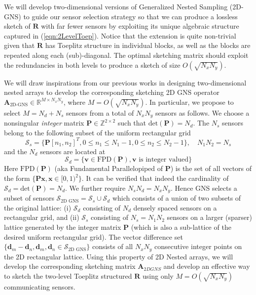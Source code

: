 {\noindent We will develop two-dimensional versions of Generalized Nested Sampling (2D-GNS) to guide our sensor selection strategy so that we can produce a lossless sketch of $\mathbf{R}$ with far fewer sensors by exploiting its unique algebraic structure captured in (\ref{eqn:2LevelToep}). Notice that the extension is quite non-trivial given that $\mathbf{R}$ has Toeplitz structure in individual blocks, as well as the blocks are repeated along each (sub)-diagonal. The optimal sketching matrix should exploit the redundancies in both levels to produce a sketch of size $O(\sqrt{N_xN_y})$. 

 We will draw inspirations from our previous works in designing two-dimensional nested arrays to develop the corresponding sketching 2D GNS operator $\mathbf{A}_{\text{2D-GNS}} \in \mathbb{R}^{M \times {N_xN_y}}$, where $M = O(\sqrt{N_xN_y})$. In particular, we propose to select $M=N_d+N_s$ sensors from a total of $N_xN_y$ sensors as follows. We choose a nonsingular {\em integer} matrix $\mathbf{P}\in \mathbb{Z}^{2\times 2}$ such that $\text{det}(\mathbf{P})=N_d$. The $N_s$ sensors belong to the following subset  of the uniform rectangular grid \[ \mathcal{S}_{s} = \{\mathbf{P}[n_1,n_2]^{T}, 0\leq n_1\leq N_1-1, 0\leq n_2\leq N_2-1 \} ,\quad N_1N_2 = N_s \]
and the $N_d$ sensors are located at \[ \mathcal{S}_d = \{ \mathbf{v} \in \text{FPD}(\mathbf{P}), \mathbf{v} \text{ is integer valued} \} \] 
Here $\text{FPD}(\mathbf{P})$ (aka Fundamental Parallelopiped of $\mathbf{P}$)  is the set of all vectors of the form $\{\mathbf{Px}, \mathbf{x}\in[0,1)^2 \}$. It can be verified that indeed the cardinality of $\mathcal{S}_d = \text{det}(\mathbf{P}) = N_d$. We further require $N_sN_d = N_xN_y$. Hence GNS selects a subset of sensors $\mathcal{S}_{\text{2D GNS}} = \mathcal{S}_s\cup \mathcal{S}_d$ which consists of a union of two subsets of the original lattice: (i) $\mathcal{S}_d$ consisting of $N_d$ densely spaced sensors on a rectangular grid, and (ii) $\mathcal{S}_s$ consisting of $N_s = N_1N_2$ sensors on a larger (sparser) lattice generated by the integer matrix $\mathbf{P}$ (which is also a sub-lattice of the desired uniform rectangular grid). The vector difference set $\{\mathbf{d}_m-\mathbf{d}_n, \mathbf{d}_m,\mathbf{d}_n\in \mathcal{S}_{\text{2D GNS}}\}$ consists of all $N_xN_y$ consecutive integer points on the 2D rectangular lattice. Using this property of 2D Nested arrays, we will develop the corresponding sketching matrix $\mathbf{A}_{2D GNS}$ and develop an effective way to sketch the two-level Toeplitz structured $\mathbf{R}$ using only $M = O(\sqrt{N_xN_y})$ communicating sensors.} 

